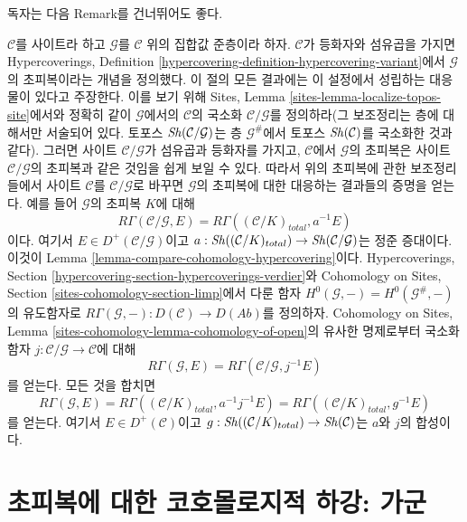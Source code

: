 \noindent
독자는 다음 Remark를 건너뛰어도 좋다.

\begin{remark}
\label{remark-compare-cohomology-hypercovering-presheaf}
$\mathcal{C}$를 사이트라 하고 $\mathcal{G}$를 $\mathcal{C}$ 위의
집합값 준층이라 하자. $\mathcal{C}$가 등화자와 섬유곱을 가지면
Hypercoverings, Definition
\ref{hypercovering-definition-hypercovering-variant}에서
$\mathcal{G}$의 초피복이라는 개념을 정의했다. 이 절의 모든 결과에는
이 설정에서 성립하는 대응물이 있다고 주장한다. 이를 보기 위해
Sites, Lemma \ref{sites-lemma-localize-topos-site}에서와 정확히 같이
$\mathcal{G}$에서의 $\mathcal{C}$의 국소화
$\mathcal{C}/\mathcal{G}$를 정의하라(그 보조정리는 층에 대해서만
서술되어 있다. 토포스 $\mathop{\mathit{Sh}}\nolimits(\mathcal{C}/\mathcal{G})$는 층
$\mathcal{G}^\#$에서 토포스 $\mathop{\mathit{Sh}}\nolimits(\mathcal{C})$를 국소화한 것과 같다).
그러면 사이트 $\mathcal{C}/\mathcal{G}$가 섬유곱과 등화자를 가지고,
$\mathcal{C}$에서 $\mathcal{G}$의 초피복은 사이트
$\mathcal{C}/\mathcal{G}$의 초피복과 같은 것임을 쉽게 보일 수 있다.
따라서 위의 초피복에 관한 보조정리들에서 사이트 $\mathcal{C}$를
$\mathcal{C}/\mathcal{G}$로 바꾸면 $\mathcal{G}$의 초피복에 대한
대응하는 결과들의 증명을 얻는다. 예를 들어 $\mathcal{G}$의 초피복
$K$에 대해
$$
R\Gamma(\mathcal{C}/\mathcal{G}, E) =
R\Gamma((\mathcal{C}/K)_{total}, a^{-1}E)
$$
이다. 여기서 $E \in D^+(\mathcal{C}/\mathcal{G})$이고
$a : \mathop{\mathit{Sh}}\nolimits((\mathcal{C}/K)_{total}) \to
\mathop{\mathit{Sh}}\nolimits(\mathcal{C}/\mathcal{G})$는 정준 증대이다. 이것이
Lemma \ref{lemma-compare-cohomology-hypercovering}이다.
Hypercoverings, Section
\ref{hypercovering-section-hypercoverings-verdier}와 Cohomology on Sites,
Section \ref{sites-cohomology-section-limp}에서 다룬 함자
$H^0(\mathcal{G}, -) = H^0(\mathcal{G}^\#, -)$의 유도함자로
$R\Gamma(\mathcal{G}, -) : D(\mathcal{C}) \to D(\textit{Ab})$를 정의하자.
Cohomology on Sites, Lemma
\ref{sites-cohomology-lemma-cohomology-of-open}의 유사한 명제로부터
국소화 함자 $j : \mathcal{C}/\mathcal{G} \to \mathcal{C}$에 대해
$$
R\Gamma(\mathcal{G}, E) = R\Gamma(\mathcal{C}/\mathcal{G}, j^{-1}E)
$$
를 얻는다. 모든 것을 합치면
$$
R\Gamma(\mathcal{G}, E) =
R\Gamma((\mathcal{C}/K)_{total}, a^{-1}j^{-1}E) =
R\Gamma((\mathcal{C}/K)_{total}, g^{-1}E)
$$
를 얻는다. 여기서 $E \in D^+(\mathcal{C})$이고
$g : \mathop{\mathit{Sh}}\nolimits((\mathcal{C}/K)_{total}) \to \mathop{\mathit{Sh}}\nolimits(\mathcal{C})$는
$a$와 $j$의 합성이다.
\end{remark}

\section{초피복에 대한 코호몰로지적 하강: 가군}
\label{section-cohomological-descent-hypercoverings-modules}


